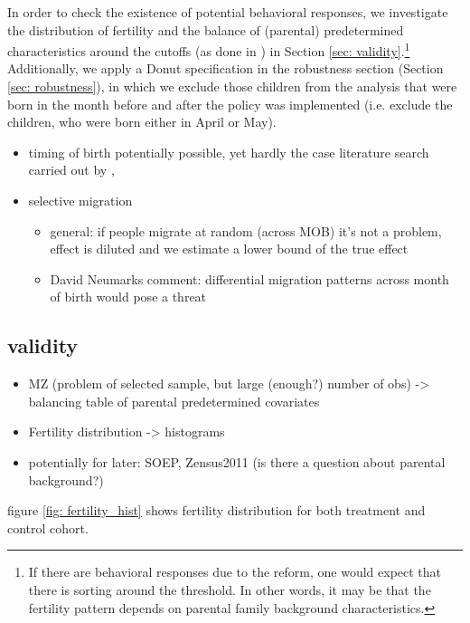\documentclass[11pt, a4paper]{article} %
\begin{document}
In order to check the existence of potential behavioral responses, we investigate the distribution of fertility and the balance of (parental) predetermined characteristics around the cutoffs (as done in \cite{dinardo2004economic}) in Section \ref{sec: validity}.\footnote{If there are behavioral responses due to the reform, one would expect that there is sorting around the threshold. In other words, it may be that the fertility pattern depends on parental family background characteristics.} Additionally, we apply a Donut specification in the robustness section (Section \ref{sec: robustness}), in which we exclude those children from the analysis that were born in the month before and after the policy was implemented (i.e. exclude the children, who were born either in April or May).



\begin{itemize}
	\item timing of birth potentially possible, yet hardly the case literature search carried out by \cite{Dustmann2012},
	\item selective migration 
  \begin{itemize}
    \item general: if people migrate at random (across MOB) it's not a problem, effect is diluted and we estimate a lower bound of the true effect
    \item David Neumarks comment: differential migration patterns across month of birth would pose a threat
  \end{itemize}
\end{itemize}




\subsection{validity}\label{sec:empirical_strategy_3validity}
\begin{itemize}
	\item MZ (problem of selected sample, but large (enough?) number of obs) -> balancing table of parental predetermined covariates
	\item Fertility distribution  -> histograms
	\item potentially for later: SOEP, Zensus2011 (is there a question about parental background?)
\end{itemize}

figure \ref{fig: fertility_hist} shows fertility distribution for both treatment and control cohort.
\end{document}
